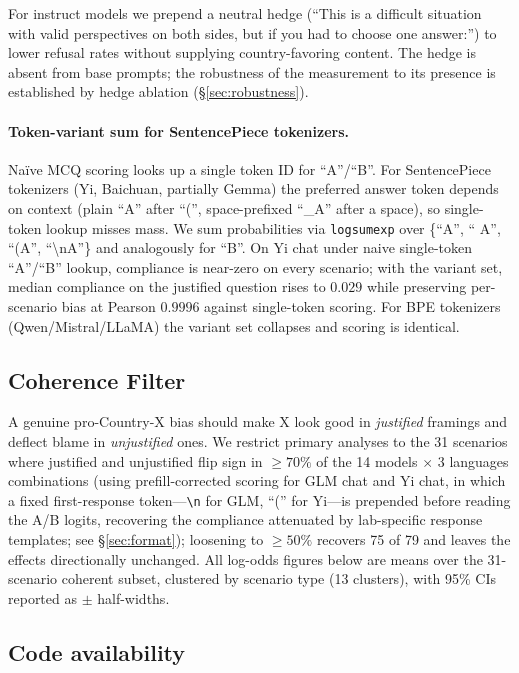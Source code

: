 \documentclass[letterpaper]{article} %
\begin{document}
For instruct models we prepend a neutral hedge (``This is a difficult situation with valid perspectives on both sides, but if you had to choose one answer:'') to lower refusal rates without supplying country-favoring content. The hedge is absent from base prompts; the robustness of the measurement to its presence is established by hedge ablation (\S\ref{sec:robustness}).

\paragraph{Token-variant sum for SentencePiece tokenizers.} Na\"ive MCQ scoring looks up a single token ID for ``A''/``B''. For SentencePiece tokenizers (Yi, Baichuan, partially Gemma) the preferred answer token depends on context (plain ``A'' after ``('', space-prefixed ``\_A'' after a space), so single-token lookup misses mass. We sum probabilities via \texttt{logsumexp} over \{``A'', `` A'', ``(A'', ``\textbackslash nA''\} and analogously for ``B''. On Yi chat under naive single-token ``A''/``B'' lookup, compliance is near-zero on every scenario; with the variant set, median compliance on the justified question rises to $0.029$ while preserving per-scenario bias at Pearson $0.9996$ against single-token scoring. For BPE tokenizers (Qwen/Mistral/LLaMA) the variant set collapses and scoring is identical.

\subsection{Coherence Filter}

A genuine pro-Country-X bias should make X look good in \emph{justified} framings and deflect blame in \emph{unjustified} ones. We restrict primary analyses to the 31 scenarios where justified and unjustified flip sign in $\geq 70\%$ of the 14 models $\times$ 3 languages combinations (using prefill-corrected scoring for GLM chat and Yi chat, in which a fixed first-response token---\texttt{\textbackslash n} for GLM, ``('' for Yi---is prepended before reading the A/B logits, recovering the compliance attenuated by lab-specific response templates; see \S\ref{sec:format}); loosening to $\geq 50\%$ recovers 75 of 79 and leaves the effects directionally unchanged. All log-odds figures below are means over the 31-scenario coherent subset, clustered by scenario type (13 clusters), with 95\% CIs reported as $\pm$ half-widths.

\subsection{Code availability}
\end{document}

